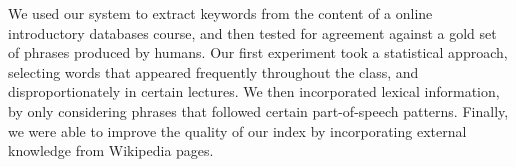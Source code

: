 We used our system to extract keywords from the content of a online introductory databases course, and then tested for agreement against a gold set of phrases produced by humans. Our first experiment took a statistical approach, selecting words that appeared frequently throughout the class, and disproportionately in certain lectures. We then incorporated lexical information, by only considering phrases that followed certain part-of-speech patterns. Finally, we were able to improve the quality of our index by incorporating external knowledge from Wikipedia pages.
